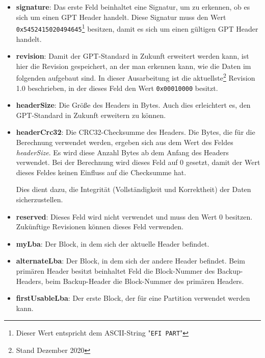 \newpage
\begin{itemize}
    \item \textbf{signature}: 
    Das erste Feld beinhaltet eine Signatur, um zu erkennen, ob es sich um einen GPT Header handelt.
    Diese Signatur muss den Wert \texttt{0x5452415020494645}\footnote{
        Dieser Wert entspricht dem ASCII-String "\texttt{EFI PART}"
    } 
    besitzen, damit es sich um einen gültigen GPT Header handelt.

    \item \textbf{revision}:
    Damit der GPT-Standard in Zukunft erweitert werden kann, ist hier die Revision gespeichert, an der man erkennen kann, wie die Daten im folgenden aufgebaut sind.
    In dieser Ausarbeitung ist die aktuellste\footnote{
        Stand Dezember 2020
    }
    Revision 1.0 beschrieben, in der dieses Feld den Wert \texttt{0x00010000} besitzt.

    \item \textbf{headerSize}:
    Die Größe des Headers in Bytes.
    Auch dies erleichtert es, den GPT-Standard in Zukunft erweitern zu können.

    \item \textbf{headerCrc32}:
    Die CRC32-Checksumme des Headers.
    Die Bytes, die für die Berechnung verwendet werden, ergeben sich aus dem Wert des Feldes \textit{headerSize}.
    Es wird diese Anzahl Bytes ab dem Anfang des Headers verwendet.
    Bei der Berechnung wird dieses Feld auf 0 gesetzt, damit der Wert dieses Feldes keinen Einfluss auf die Checksumme hat.

    Dies dient dazu, die Integrität (Vollständigkeit und Korrektheit) der Daten sicherzustellen. 

    \item \textbf{reserved}:
    Dieses Feld wird nicht verwendet und muss den Wert 0 besitzen. Zukünftige Revisionen können dieses Feld verwenden.

    \item \textbf{myLba}:
    Der Block, in dem sich der aktuelle Header befindet.

    \item \textbf{alternateLba}:
    Der Block, in dem sich der andere Header befindet.
    Beim primären Header besitzt beinhaltet Feld die Block-Nummer des Backup-Headers, beim Backup-Header die Block-Nummer des primären Headers.

    \item \textbf{firstUsableLba}:
    Der erste Block, der für eine Partition verwendet werden kann.


\end{itemize}
